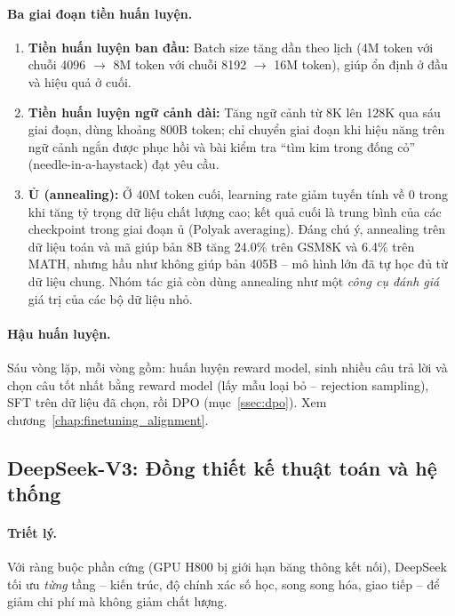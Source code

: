 \paragraph{Ba giai đoạn tiền huấn luyện.}
\begin{enumerate}
	\item \textbf{Tiền huấn luyện ban đầu:} Batch size tăng dần theo lịch (4M token với chuỗi 4096 $\rightarrow$ 8M token với chuỗi 8192 $\rightarrow$ 16M token), giúp ổn định ở đầu và hiệu quả ở cuối.
	\item \textbf{Tiền huấn luyện ngữ cảnh dài:} Tăng ngữ cảnh từ 8K lên 128K qua sáu giai đoạn, dùng khoảng 800B token; chỉ chuyển giai đoạn khi hiệu năng trên ngữ cảnh ngắn được phục hồi và bài kiểm tra “tìm kim trong đống cỏ” (needle-in-a-haystack) đạt yêu cầu.
	\item \textbf{Ủ (annealing):} Ở 40M token cuối, learning rate giảm tuyến tính về 0 trong khi tăng tỷ trọng dữ liệu chất lượng cao; kết quả cuối là trung bình của các checkpoint trong giai đoạn ủ (Polyak averaging). Đáng chú ý, annealing trên dữ liệu toán và mã giúp bản 8B tăng 24.0\% trên GSM8K và 6.4\% trên MATH, nhưng hầu như không giúp bản 405B -- mô hình lớn đã tự học đủ từ dữ liệu chung. Nhóm tác giả còn dùng annealing như một \emph{công cụ đánh giá} giá trị của các bộ dữ liệu nhỏ.
\end{enumerate}

\paragraph{Hậu huấn luyện.} Sáu vòng lặp, mỗi vòng gồm: huấn luyện reward model, sinh nhiều câu trả lời và chọn câu tốt nhất bằng reward model (lấy mẫu loại bỏ -- rejection sampling), SFT trên dữ liệu đã chọn, rồi DPO (mục~\ref{ssec:dpo}). Xem chương~\ref{chap:finetuning_alignment}.

\subsection{DeepSeek-V3: Đồng thiết kế thuật toán và hệ thống}
\label{ssec:deepseekv3_recipe}

\paragraph{Triết lý.} Với ràng buộc phần cứng (GPU H800 bị giới hạn băng thông kết nối), DeepSeek tối ưu \emph{từng} tầng -- kiến trúc, độ chính xác số học, song song hóa, giao tiếp -- để giảm chi phí mà không giảm chất lượng.

